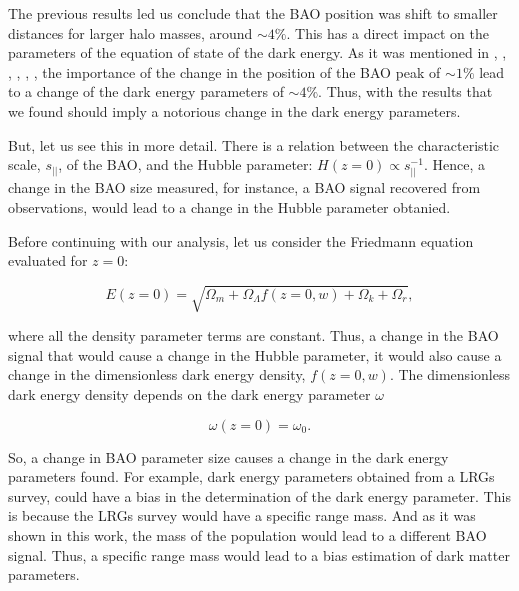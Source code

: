 The previous results led us conclude that the BAO position was shift to smaller distances
for larger halo masses, around $\sim 4\%$. This has a direct impact on the parameters of the 
equation of state of the dark energy. As it was mentioned in \cite{motion}, \cite{uno}, \cite{dos}, \cite{tres}, \cite{cuatro}, \cite{crocce}, the importance of the change in the position of the 
BAO peak of $\sim 1\%$ lead to a change of the dark energy parameters of $\sim 4\%$. Thus, with 
the results that we found should imply a notorious change in the dark energy parameters. 

But, let us see this in more detail. There is a relation between the characteristic scale, $s_{||}$, of the BAO, and the Hubble parameter: $H(z=0) \propto s_{||}^{-1} $. 
Hence, a change in the BAO size measured, for instance, a BAO signal recovered from observations,
would lead to a change in the Hubble parameter obtanied. 

Before continuing with our analysis, let us consider the Friedmann equation evaluated for $z=0$:

\[ E(z=0) = \sqrt{\Omega_m+\Omega_{\Lambda}f(z=0,w)+\Omega_k+  \Omega_r},\]


where all the density parameter terms are constant. Thus, a change in the BAO signal that would cause a change in the Hubble parameter, it would also cause a change in the dimensionless dark energy density, $f(z=0,w)$.  The dimensionless dark energy density depends on the  dark energy parameter $\omega$

\[ \omega(z=0) = \omega_0.\]

So, a change in BAO parameter size causes a change in the dark energy parameters found.
For example, dark energy parameters obtained from a LRGs survey, could have a bias in the determination of the dark energy parameter. This is because the LRGs survey would have a specific range mass. 
And as it was shown in this work, the mass of the population would lead to a different BAO signal.
Thus, a specific range mass would lead to a bias estimation of dark matter parameters. 
